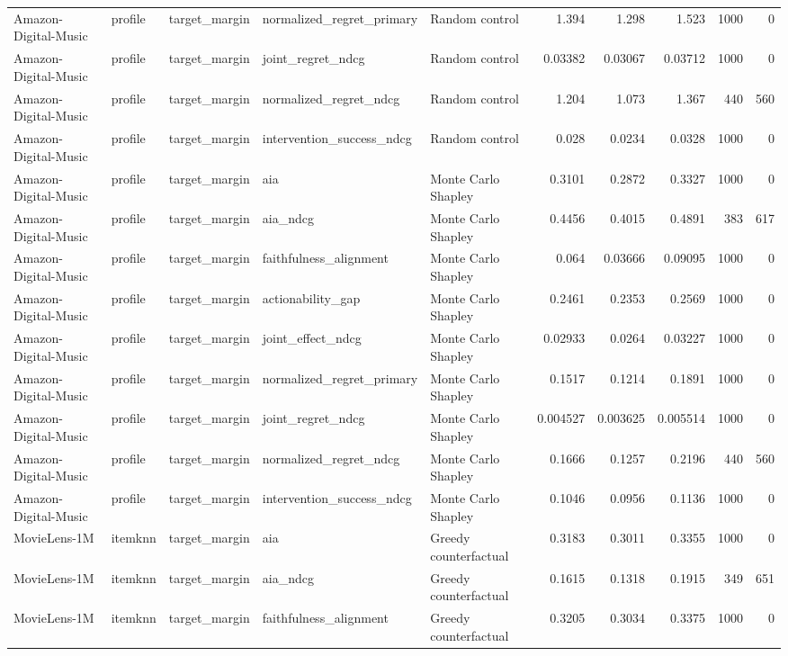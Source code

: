 \begin{table}[t]
\begin{tabular}{lllllrrrrr}
Amazon-Digital-Music & profile & target\_margin & normalized\_regret\_primary & Random control & 1.394 & 1.298 & 1.523 & 1000 & 0 \\
Amazon-Digital-Music & profile & target\_margin & joint\_regret\_ndcg & Random control & 0.03382 & 0.03067 & 0.03712 & 1000 & 0 \\
Amazon-Digital-Music & profile & target\_margin & normalized\_regret\_ndcg & Random control & 1.204 & 1.073 & 1.367 & 440 & 560 \\
Amazon-Digital-Music & profile & target\_margin & intervention\_success\_ndcg & Random control & 0.028 & 0.0234 & 0.0328 & 1000 & 0 \\
Amazon-Digital-Music & profile & target\_margin & aia & Monte Carlo Shapley & 0.3101 & 0.2872 & 0.3327 & 1000 & 0 \\
Amazon-Digital-Music & profile & target\_margin & aia\_ndcg & Monte Carlo Shapley & 0.4456 & 0.4015 & 0.4891 & 383 & 617 \\
Amazon-Digital-Music & profile & target\_margin & faithfulness\_alignment & Monte Carlo Shapley & 0.064 & 0.03666 & 0.09095 & 1000 & 0 \\
Amazon-Digital-Music & profile & target\_margin & actionability\_gap & Monte Carlo Shapley & 0.2461 & 0.2353 & 0.2569 & 1000 & 0 \\
Amazon-Digital-Music & profile & target\_margin & joint\_effect\_ndcg & Monte Carlo Shapley & 0.02933 & 0.0264 & 0.03227 & 1000 & 0 \\
Amazon-Digital-Music & profile & target\_margin & normalized\_regret\_primary & Monte Carlo Shapley & 0.1517 & 0.1214 & 0.1891 & 1000 & 0 \\
Amazon-Digital-Music & profile & target\_margin & joint\_regret\_ndcg & Monte Carlo Shapley & 0.004527 & 0.003625 & 0.005514 & 1000 & 0 \\
Amazon-Digital-Music & profile & target\_margin & normalized\_regret\_ndcg & Monte Carlo Shapley & 0.1666 & 0.1257 & 0.2196 & 440 & 560 \\
Amazon-Digital-Music & profile & target\_margin & intervention\_success\_ndcg & Monte Carlo Shapley & 0.1046 & 0.0956 & 0.1136 & 1000 & 0 \\
MovieLens-1M & itemknn & target\_margin & aia & Greedy counterfactual & 0.3183 & 0.3011 & 0.3355 & 1000 & 0 \\
MovieLens-1M & itemknn & target\_margin & aia\_ndcg & Greedy counterfactual & 0.1615 & 0.1318 & 0.1915 & 349 & 651 \\
MovieLens-1M & itemknn & target\_margin & faithfulness\_alignment & Greedy counterfactual & 0.3205 & 0.3034 & 0.3375 & 1000 & 0 \\

\end{tabular}
\end{table}
